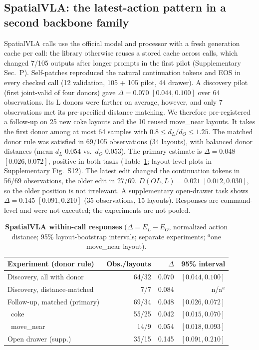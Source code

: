 \subsection{SpatialVLA: the latest-action pattern in a second backbone family}
\label{sec:svlares}
SpatialVLA calls use the official model and processor with a fresh generation cache per call: the library otherwise reuses a stored cache across calls, which changed 7/105 outputs after longer prompts in the first pilot (Supplementary Sec.~P). Self-patches reproduced the natural continuation tokens and EOS in every checked call (12 validation, 105 + 105 pilot, 44 drawer). A discovery pilot (first joint-valid of four donors) gave $\Delta=0.070$ $[0.044,0.100]$ over 64 observations. Its L donors were farther on average, however, and only 7 observations met its pre-specified distance matching. We therefore pre-registered a follow-up on 25 new coke layouts and the 10 reused move\_near layouts. It takes the first donor among at most 64 samples with $0.8\le d_L/d_O\le1.25$. The matched donor rule was satisfied in 69/105 observations (34 layouts), with balanced donor distances (mean $d_L$ 0.054 vs.\ $d_O$ 0.053). The primary estimate is $\Delta=0.048$ $[0.026,0.072]$, positive in both tasks (Table~\ref{tab:svla}; layout-level plots in Supplementary Fig.~S12). The latest edit changed the continuation tokens in 56/69 observations, the older edit in 27/69. $D(OL,L)=0.021$ $[0.012,0.030]$, so the older position is not irrelevant. A supplementary open-drawer task shows $\Delta=0.145$ $[0.091,0.210]$ (35 observations, 15 layouts). Responses are command-level and were not executed; the experiments are not pooled.

\begin{table}[t]
\centering\small
\caption{\textbf{SpatialVLA within-call responses} ($\Delta=E_L-E_O$, normalized action distance; 95\% layout-bootstrap intervals; separate experiments; $^{a}$one move\_near layout).}
\label{tab:svla}
\footnotesize\setlength{\tabcolsep}{2.5pt}
\begin{tabular}{@{}lrrr@{}}\toprule
Experiment (donor rule) & Obs./layouts & $\Delta$ & 95\% interval\\\midrule
Discovery, all with donor & 64/32 & 0.070 & $[0.044,0.100]$\\
Discovery, distance-matched & 7/7 & 0.084 & n/a$^{a}$\\
Follow-up, matched (primary) & 69/34 & 0.048 & $[0.026,0.072]$\\
\ coke & 55/25 & 0.042 & $[0.015,0.070]$\\
\ move\_near & 14/9 & 0.054 & $[0.018,0.093]$\\
Open drawer (supp.) & 35/15 & 0.145 & $[0.091,0.210]$\\\bottomrule
\end{tabular}
\end{table}



